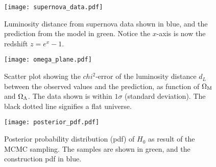     \begin{figure}
        \texttt{[image: supernova\_data.pdf]}
        \caption{Luminosity distance from supernova data shown in blue, and the prediction from the model in green. Notice the $x$-axis is now the redshift $z=e^x-1$.}
        \label{fig:m1:supernova_data}
    \end{figure}

    \begin{figure}
        \texttt{[image: omega\_plane.pdf]}
        \caption{Scatter plot showing the $chi^2$-error of the luminosity distance $d_L$ between the observed values and the prediction, as function of $\Omega_\mathrm{M}$ and $\Omega_\Lambda$. The data shown is within $1\sigma$ (standard deviation). The black dotted line signifies a flat universe. }
        \label{fig:m1:omega_planes}
    \end{figure}

    \begin{figure}
        \texttt{[image: posterior\_pdf.pdf]}
        \caption{Posterior probability distribution (pdf) of $H_0$ as result of the MCMC sampling. The samples are shown in green, and the construction pdf in blue. }
        \label{fig:m1:posterior_pdf}
    \end{figure}

    
